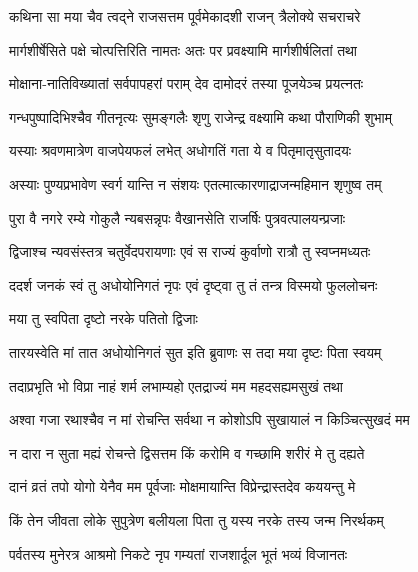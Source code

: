 \twolineshloka
{कथिना सा मया चैव त्वद्ने राजसत्तम}
{पूर्वमेकादशी राजन् त्रैलोक्ये सचराचरे} %

\twolineshloka
{मार्गशीर्षेसिते पक्षे चोत्पत्तिरिति नामतः}
{अतः पर प्रवक्ष्यामि मार्गशीर्षलितां तथा} %

\twolineshloka
{मोक्षाना-नातिविख्यातां सर्वपापहरां पराम्}
{देव दामोदरं तस्या पूजयेञ्च प्रयत्नतः} %

\twolineshloka
{गन्धपुष्पादिभिश्चैव गीतनृत्यः सुमङ्गलैः}
{शृणु राजेन्द्र वक्ष्यामि कथा पौराणिकी शुभाम्} %

\twolineshloka
{यस्याः श्रवणमात्रेण वाजपेयफलं लभेत्}
{अधोगतिं गता ये व पितृमातृसुतादयः} %

\twolineshloka
{अस्याः पुण्यप्रभावेण स्वर्ग यान्ति न संशयः}
{एतत्मात्कारणाद्राजन्महिमान शृणुष्व तम्} %

\twolineshloka
{पुरा वै नगरे रम्ये गोकुलै न्यबसन्नृपः}
{वैखानसेति राजर्षिः पुत्रवत्पालयन्प्रजाः} %

\twolineshloka
{द्विजाश्च न्यवसंस्तत्र चतुर्वेदपरायणाः}
{एवं स राज्यं कुर्वाणो रात्रौ तु स्वप्नमध्यतः} %

\twolineshloka
{ददर्श जनकं स्वं तु अधोयोनिगतं नृपः}
{एवं दृष्ट्वा तु तं तन्त्र विस्मयो फुललोचनः} %



\onelineshloka
{मया तु स्वपिता दृष्टो नरके पतितो द्विजाः} %

\twolineshloka
{तारयस्वेति मां तात अधोयोनिगतं सुत}
{इति ब्रुवाणः स तदा मया दृष्टः पिता स्वयम्} %

\twolineshloka
{तदाप्रभृति भो विप्रा नाहं शर्म लभाम्यहो}
{एतद्राज्यं मम महदसह्यमसुखं तथा} %

\twolineshloka
{अश्वा गजा रथाश्चैव न मां रोचन्ति सर्वथा}
{न कोशोऽपि सुखायालं न किञ्चित्सुखदं मम} %

\twolineshloka
{न दारा न सुता मह्यं रोचन्ते द्विसत्तम}
{किं करोमि व गच्छामि शरीरं मे तु दह्यते} %

\twolineshloka
{दानं व्रतं तपो योगो येनैव मम पूर्वजाः}
{मोक्षमायान्ति विप्रेन्द्रास्तदेव कययन्तु मे} %

\twolineshloka
{किं तेन जीवता लोके सुपुत्रेण बलीयला}
{पिता तु यस्य नरके तस्य जन्म निरर्थकम्} %


\twolineshloka
{पर्वतस्य मुनेरत्र आश्रमो निकटे नृप}
{गम्यतां राजशार्दूल भूतं भव्यं विजानतः} %

